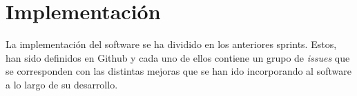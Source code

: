\chapter{Implementación}

La implementación del software se ha dividido en los anteriores sprints. Estos, han sido definidos en Github
y cada uno de ellos contiene un grupo de \textit{issues} que se corresponden con las distintas
mejoras que se han ido incorporando al software a lo largo de su desarrollo.\\

